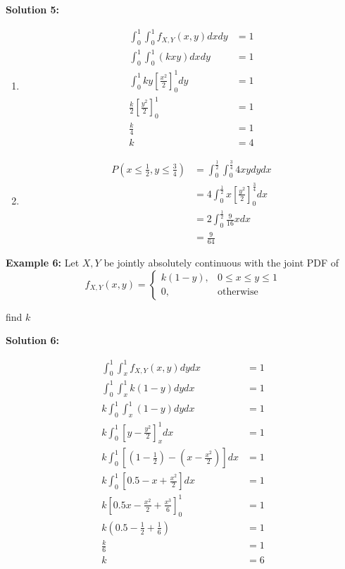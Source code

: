 \documentclass[12pt, twoside]{article}
\begin{document}
\textbf{Solution 5:}
\begin{enumerate}
	\item{
	\begin{align*}
		\int^1_0 \int^1_0 f_{X,Y}(x,y) dx dy &= 1\\
		\int^1_0 \int^1_0 (kxy) dx dy &= 1\\
		\int^1_0 ky[\frac{x^2}{2}]^1_0 dy &= 1\\
		\frac{k}{2} [\frac{y^2}{2}]^1_0 &= 1\\
		\frac{k}{4} &= 1\\
		k &= 4
	\end{align*}
	}
	\item{
	\begin{align*}
		P(x \leq \frac{1}{2}, y \leq \frac{3}{4}) &= \int_0^{\frac{1}{2}} \int_0^{\frac{3}{4}} 4xydydx\\
		&= 4 \int_0^{\frac{1}{2}} x[\frac{y^2}{2}]^{\frac{3}{4}}_0 dx\\
		&= 2 \int_0^{\frac{1}{2}} \frac{9}{16} x dx\\
		&=\frac{9}{64}
	\end{align*}
	}
\end{enumerate}

\textbf{Example 6:} Let $X,Y$ be jointly absolutely continuous with the joint PDF of $$f_{X,Y} (x,y) = \begin{cases}
	k(1-y), & 0 \leq x \leq y \leq 1\\
	0, & \text{otherwise}
\end{cases}
$$

find $k$

\textbf{Solution 6:}

\begin{align*}
	\int_0^1 \int_x^1 f_{X,Y} (x,y) dy dx &= 1\\
	\int_0^1 \int_x^1 k(1-y) dy dx &= 1\\
	k\int_0^1 \int_x^1 (1-y) dy dx &= 1\\
	k\int_0^1 [y - \frac{y^2}{2}]^1_x dx &= 1\\
	k\int_0^1 [(1-\frac{1}{2}) - (x - \frac{x^2}{2})] dx &= 1\\
	k\int_0^1 [0.5 - x + \frac{x^2}{2}] dx &= 1\\
	k[0.5x - \frac{x^2}{2} + \frac{x^3}{6}]^1_0 &= 1\\
	k(0.5 - \frac{1}{2} + \frac{1}{6}) &= 1\\
	\frac{k}{6} &= 1\\
	k &= 6
\end{align*}
\end{document}
